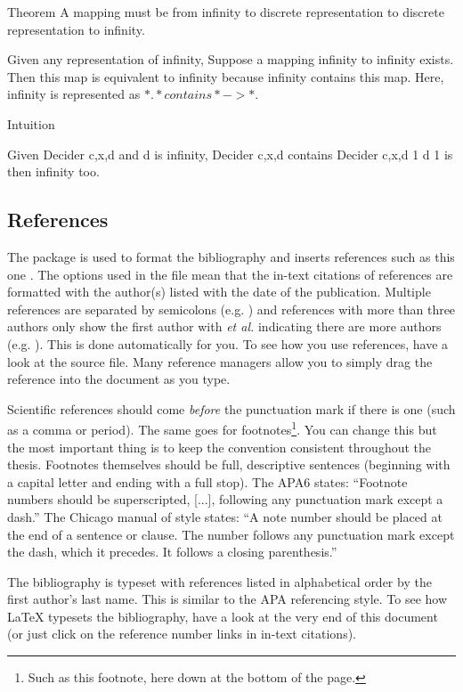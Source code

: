 Theorem
A mapping must be from infinity to discrete representation to discrete representation to infinity.

Given any representation of infinity,
Suppose a mapping infinity to infinity exists.
Then this map is equivalent to infinity because 
infinity contains this map.
Here, infinity is represented as $\ast. \ast contains \ast -> \ast.$

Intuition

Given Decider c,x,d and d is infinity,
Decider c,x,d contains Decider c,x,d 1
d 1 is then infinity too.


\subsection{References}

The  package is used to format the bibliography and inserts references such as this one \parencite{Reference1}. The options used in the  file mean that the in-text citations of references are formatted with the author(s) listed with the date of the publication. Multiple references are separated by semicolons (e.g. \parencite{Reference2, Reference1}) and references with more than three authors only show the first author with \emph{et al.} indicating there are more authors (e.g. \parencite{Reference3}). This is done automatically for you. To see how you use references, have a look at the  source file. Many reference managers allow you to simply drag the reference into the document as you type.

Scientific references should come \emph{before} the punctuation mark if there is one (such as a comma or period). The same goes for footnotes\footnote{Such as this footnote, here down at the bottom of the page.}. You can change this but the most important thing is to keep the convention consistent throughout the thesis. Footnotes themselves should be full, descriptive sentences (beginning with a capital letter and ending with a full stop). The APA6 states: \enquote{Footnote numbers should be superscripted, [...], following any punctuation mark except a dash.} The Chicago manual of style states: \enquote{A note number should be placed at the end of a sentence or clause. The number follows any punctuation mark except the dash, which it precedes. It follows a closing parenthesis.}

The bibliography is typeset with references listed in alphabetical order by the first author's last name. This is similar to the APA referencing style. To see how \LaTeX{} typesets the bibliography, have a look at the very end of this document (or just click on the reference number links in in-text citations).

